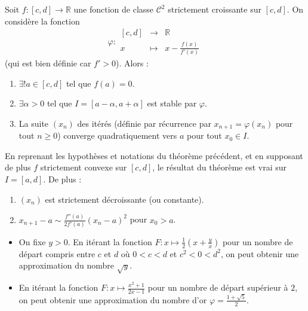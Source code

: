   \begin{theorem}
    Soit $f : [c, d] \rightarrow \mathbb{R}$ une fonction de classe $\mathcal{C}^2$ strictement croissante sur $[c, d]$. On considère la fonction
    \[ \varphi :
    \begin{array}{ccc}
      [c, d] &\rightarrow& \mathbb{R} \\
      x &\mapsto& x - \frac{f(x)}{f'(x)}
    \end{array}
    \]
    (qui est bien définie car $f' > 0$). Alors :
    \begin{enumerate}[label=(\roman*)]
      \item $\exists! a \in [c, d]$ tel que $f(a) = 0$.
      \item $\exists \alpha > 0$ tel que $I = [a - \alpha, a + \alpha]$ est stable par $\varphi$.
      \item La suite $(x_n)$ des itérés (définie par récurrence par $x_{n+1} = \varphi(x_n)$ pour tout $n \geq 0$) converge quadratiquement vers $a$ pour tout $x_0 \in I$.
    \end{enumerate}
  \end{theorem}

  \begin{corollary}
    En reprenant les hypothèses et notations du théorème précédent, et en supposant de plus $f$ strictement convexe sur $[c, d]$, le résultat du théorème est vrai sur $I = [a, d]$. De plus :
    \begin{enumerate}[label=(\roman*)]
      \item $(x_n)$ est strictement décroissante (ou constante).
      \item $x_{n+1} - a \sim \frac{f''(a)}{2f'(a)} (x_n - a)^2$ pour $x_0 > a$.
    \end{enumerate}
  \end{corollary}

  \begin{example}
    \begin{itemize}
      \item On fixe $y > 0$. En itérant la fonction $F : x \mapsto \frac{1}{2} \left( x + \frac{y}{x} \right)$ pour un nombre de départ compris entre $c$ et $d$ où $0 < c < d$ et $c^2 < 0 < d^2$, on peut obtenir une approximation du nombre $\sqrt{y}$.
      \item En itérant la fonction $F : x \mapsto \frac{x^2+1}{2x-1}$ pour un nombre de départ supérieur à $2$, on peut obtenir une approximation du nombre d'or $\varphi = \frac{1+\sqrt{5}}{2}$.
    \end{itemize}
  \end{example}

